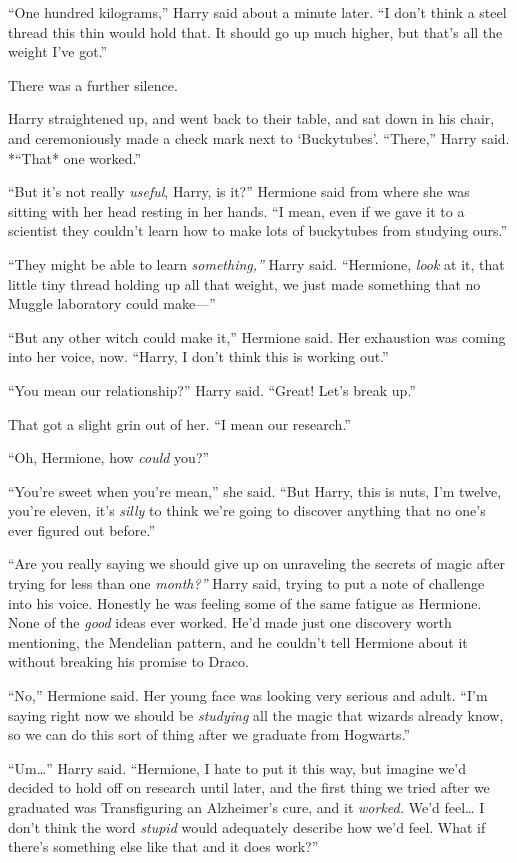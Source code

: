 ``One hundred kilograms,'' Harry said about a minute later. ``I don't
think a steel thread this thin would hold that. It should go up much
higher, but that's all the weight I've got.''

There was a further silence.

Harry straightened up, and went back to their table, and sat down in his
chair, and ceremoniously made a check mark next to `Buckytubes'.
``There,'' Harry said. *``That* one worked.''

``But it's not really \emph{useful}, Harry, is it?'' Hermione said from
where she was sitting with her head resting in her hands. ``I mean, even
if we gave it to a scientist they couldn't learn how to make lots of
buckytubes from studying ours.''

``They might be able to learn \emph{something,''} Harry said.
``Hermione, \emph{look} at it, that little tiny thread holding up all
that weight, we just made something that no Muggle laboratory could
make---''

``But any other witch could make it,'' Hermione said. Her exhaustion was
coming into her voice, now. ``Harry, I don't think this is working
out.''

``You mean our relationship?'' Harry said. ``Great! Let's break up.''

That got a slight grin out of her. ``I mean our research.''

``Oh, Hermione, how \emph{could} you?''

``You're sweet when you're mean,'' she said. ``But Harry, this is nuts,
I'm twelve, you're eleven, it's \emph{silly} to think we're going to
discover anything that no one's ever figured out before.''

``Are you really saying we should give up on unraveling the secrets of
magic after trying for less than one \emph{month?''} Harry said, trying
to put a note of challenge into his voice. Honestly he was feeling some
of the same fatigue as Hermione. None of the \emph{good} ideas ever
worked. He'd made just one discovery worth mentioning, the Mendelian
pattern, and he couldn't tell Hermione about it without breaking his
promise to Draco.

``No,'' Hermione said. Her young face was looking very serious and
adult. ``I'm saying right now we should be \emph{studying} all the magic
that wizards already know, so we can do this sort of thing after we
graduate from Hogwarts.''

``Um\ldots{}'' Harry said. ``Hermione, I hate to put it this way, but
imagine we'd decided to hold off on research until later, and the first
thing we tried after we graduated was Transfiguring an Alzheimer's cure,
and it \emph{worked.} We'd feel\ldots{} I don't think the word
\emph{stupid} would adequately describe how we'd feel. What if there's
something else like that and it does work?''

